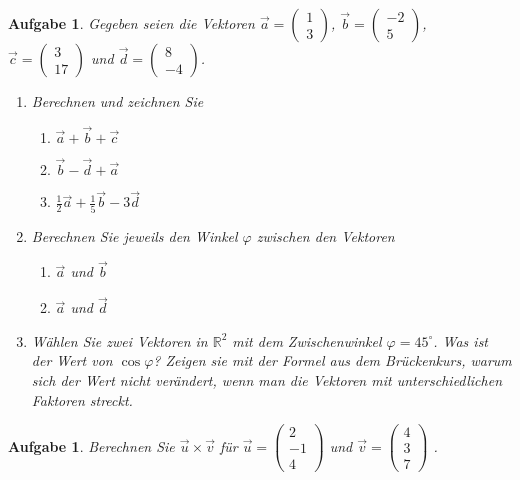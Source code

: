 \documentclass[12pt]{article}
\newtheorem{exercise}[satz]{Aufgabe}
\begin{document}
\begin{exercise}
  Gegeben seien die Vektoren
  $\vec{a}=\left(\begin{array}{r} 1 \\ 3 \end{array}\right)$,
  $\vec{b}=\left(\begin{array}{r} -2 \\ 5 \end{array}\right)$,\\
  $\vec{c}=\left(\begin{array}{r} 3 \\ 17 \end{array}\right)$ und
  $\vec{d}=\left(\begin{array}{r} 8 \\ -4 \end{array}\right)$.
  \begin{enumerate}
  \item[(a)] Berechnen und zeichnen Sie
      \begin{enumerate}
      \item[(i)] $\vec{a}+\vec{b}+\vec{c}$
      \item[(ii)] $\vec{b}-\vec{d}+\vec{a}$
      \item[(iii)] $\frac{1}{2}\vec{a}+\frac{1}{5}\vec{b}-3\vec{d}$
      \end{enumerate}
  \item[(b)] Berechnen Sie jeweils den Winkel $\varphi$ zwischen den Vektoren
    \begin{enumerate}
      \item[(i)] $\vec{a}$ und $\vec{b}$
      \item[(ii)] $\vec{a}$ und $\vec{d}$
      \end{enumerate}
    \item[(c)] W\"ahlen Sie zwei Vektoren in $\mathbb{R}^2$ mit dem Zwischenwinkel $\varphi=45^\circ$. Was ist der Wert von $\cos{\varphi}$? Zeigen sie mit der Formel aus dem Br\"uckenkurs, warum sich der Wert nicht  ver\"andert, wenn man die Vektoren mit unterschiedlichen Faktoren streckt. 
  \end{enumerate}
\end{exercise}

\vspace{0.1cm}   


\begin{exercise}
  Berechnen Sie $\vec{u}\times \vec{v}$ f\"ur
  $\vec{u}=\left(\begin{array}{r} 2 \\ -1 \\ 4 \end{array}\right)$ und
  $\vec{v}=\left(\begin{array}{r} 4 \\ 3 \\ 7 \end{array}\right)$ .
\end{exercise}
\end{document}
